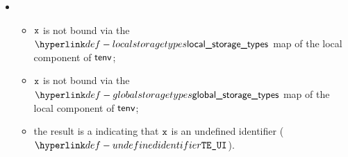 \begin{itemize}
\begin{itemize}
    \item {}
    \begin{itemize}
      \item $\vx$ is not bound via the $\localstoragetypes$ map of the local component of $\tenv$;
      \item $\vx$ is not bound via the $\globalstoragetypes$ map of the local component of $\tenv$;
      \item the result is a \typingerrorterm{} indicating that $\vx$ is an undefined identifier ($\UndefinedIdentifier$).
    \end{itemize}
  \end{itemize}
\end{itemize}

\FormallyParagraph
\begin{mathpar}
\end{mathpar}

\begin{mathpar}
\end{mathpar}

\begin{mathpar}
\end{mathpar}

\begin{mathpar}
\end{mathpar}

